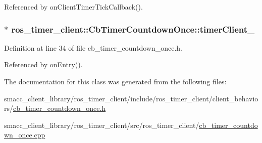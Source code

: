 Referenced by on\+Client\+Timer\+Tick\+Callback().

\subsubsection[{\texorpdfstring{timer\+Client\+\_\+}{timerClient_}}]{$\ast$ ros\+\_\+timer\+\_\+client\+::\+Cb\+Timer\+Countdown\+Once\+::timer\+Client\+\_\+\hspace{0.3cm}{\ttfamily [private]}}\hypertarget{classros__timer__client_1_1CbTimerCountdownOnce_aad83d66fc9be53efdad961a270ec9e22}{}\label{classros__timer__client_1_1CbTimerCountdownOnce_aad83d66fc9be53efdad961a270ec9e22}


Definition at line 34 of file cb\+\_\+timer\+\_\+countdown\+\_\+once.\+h.



Referenced by on\+Entry().



The documentation for this class was generated from the following files\+:\begin{DoxyCompactItemize}
\item 
smacc\+\_\+client\+\_\+library/ros\+\_\+timer\+\_\+client/include/ros\+\_\+timer\+\_\+client/client\+\_\+behaviors/\hyperlink{cb__timer__countdown__once_8h}{cb\+\_\+timer\+\_\+countdown\+\_\+once.\+h}\item 
smacc\+\_\+client\+\_\+library/ros\+\_\+timer\+\_\+client/src/ros\+\_\+timer\+\_\+client/\hyperlink{cb__timer__countdown__once_8cpp}{cb\+\_\+timer\+\_\+countdown\+\_\+once.\+cpp}\end{DoxyCompactItemize}
